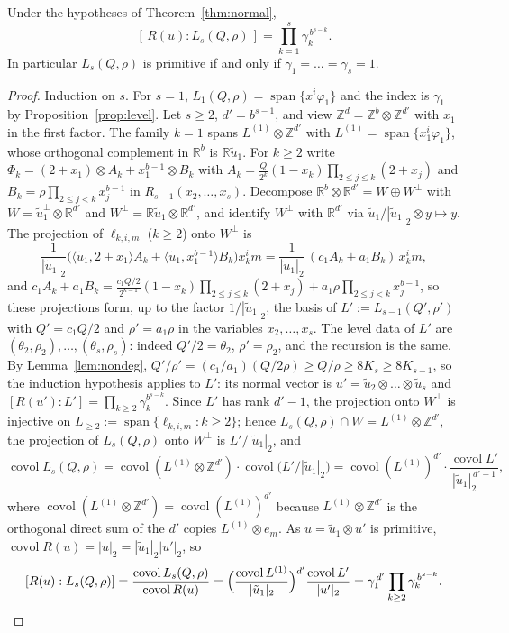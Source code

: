 \documentclass[12pt]{article}
\newcommand{\Z}{\mathbb{Z}}
\newcommand{\R}{\mathbb{R}}
\newcommand{\covol}{\operatorname{covol}}
\begin{document}
\begin{theorem}\label{thm:index}
Under the hypotheses of Theorem~\ref{thm:normal},
\[
[\,R(u):L_s(Q,\rho)\,]=\prod_{k=1}^{s}\gamma_k^{\,b^{s-k}} .
\]
In particular $L_s(Q,\rho)$ is primitive if and only if $\gamma_1=\dots=\gamma_s=1$.
\end{theorem}
\begin{proof}
Induction on $s$. For $s=1$, $L_1(Q,\rho)=\operatorname{span}\{x^i\varphi_1\}$ and the index is $\gamma_1$ by
Proposition~\ref{prop:level}. Let $s\ge2$, $d'=b^{s-1}$, and view $\Z^d=\Z^b\otimes\Z^{d'}$ with $x_1$ in the first factor.
The family $k=1$ spans $L^{(1)}\otimes\Z^{d'}$ with $L^{(1)}=\operatorname{span}\{x_1^i\varphi_1\}$, whose orthogonal complement
in $\R^b$ is $\R\tilde u_1$. For $k\ge2$ write $\Phi_k=(2+x_1)\otimes A_k+x_1^{b-1}\otimes B_k$ with
$A_k=\frac{Q}{2^k}(1-x_k)\prod_{2\le j\le k}(2+x_j)$ and $B_k=\rho\prod_{2\le j<k}x_j^{b-1}$ in $R_{s-1}(x_2,\dots,x_s)$.
Decompose $\R^b\otimes\R^{d'}=W\oplus W^\perp$ with $W=\tilde u_1^\perp\otimes\R^{d'}$ and
$W^\perp=\R\tilde u_1\otimes\R^{d'}$, and identify $W^\perp$ with $\R^{d'}$ via $\tilde u_1/|\tilde u_1|_2\otimes y\mapsto y$.
The projection of $\ell_{k,i,m}$ ($k\ge2$) onto $W^\perp$ is
\[
\frac{1}{|\tilde u_1|_2}\bigl(\langle\tilde u_1,2+x_1\rangle A_k+\langle\tilde u_1,x_1^{b-1}\rangle B_k\bigr)x_k^im
=\frac{1}{|\tilde u_1|_2}\,(c_1A_k+a_1B_k)\,x_k^im ,
\]
and $c_1A_k+a_1B_k=\frac{c_1Q/2}{2^{k-1}}(1-x_k)\prod_{2\le j\le k}(2+x_j)+a_1\rho\prod_{2\le j<k}x_j^{b-1}$, so these
projections form, up to the factor $1/|\tilde u_1|_2$, the basis of $L':=L_{s-1}(Q',\rho')$ with $Q'=c_1Q/2$ and
$\rho'=a_1\rho$ in the variables $x_2,\dots,x_s$. The level data of $L'$ are $(\theta_2,\rho_2),\dots,(\theta_s,\rho_s)$:
indeed $Q'/2=\theta_2$, $\rho'=\rho_2$, and the recursion is the same. By Lemma~\ref{lem:nondeg},
$Q'/\rho'=(c_1/a_1)(Q/2\rho)\ge Q/\rho\ge8K_s\ge8K_{s-1}$, so the induction hypothesis applies to $L'$: its normal vector is
$u'=\tilde u_2\otimes\dots\otimes\tilde u_s$ and $[R(u'):L']=\prod_{k\ge2}\gamma_k^{b^{s-k}}$.
Since $L'$ has rank $d'-1$, the projection onto $W^\perp$ is injective on $L_{\ge2}:=\operatorname{span}\{\ell_{k,i,m}:k\ge2\}$;
hence $L_s(Q,\rho)\cap W=L^{(1)}\otimes\Z^{d'}$, the projection of $L_s(Q,\rho)$ onto $W^\perp$ is $L'/|\tilde u_1|_2$, and
\[
\covol L_s(Q,\rho)=\covol(L^{(1)}\otimes\Z^{d'})\cdot\covol\bigl(L'/|\tilde u_1|_2\bigr)
=\covol(L^{(1)})^{d'}\cdot\frac{\covol L'}{|\tilde u_1|_2^{\,d'-1}} ,
\]
where $\covol(L^{(1)}\otimes\Z^{d'})=\covol(L^{(1)})^{d'}$ because $L^{(1)}\otimes\Z^{d'}$ is the orthogonal direct sum
of the $d'$ copies $L^{(1)}\otimes e_m$. As $u=\tilde u_1\otimes u'$ is primitive, $\covol R(u)=|u|_2=|\tilde u_1|_2|u'|_2$, so
\[
[R(u):L_s(Q,\rho)]=\frac{\covol L_s(Q,\rho)}{\covol R(u)}=\Bigl(\frac{\covol L^{(1)}}{|\tilde u_1|_2}\Bigr)^{d'}\frac{\covol L'}{|u'|_2}
=\gamma_1^{\,d'}\prod_{k\ge2}\gamma_k^{\,b^{s-k}} .\qedhere
\]
\end{proof}
\end{document}
